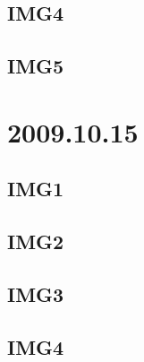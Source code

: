 \subsection{IMG4}


\subsection{IMG5}


\section{2009.10.15}
\subsection{IMG1}


\subsection{IMG2}


\subsection{IMG3}


\subsection{IMG4}

